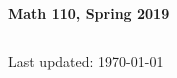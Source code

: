 \documentclass[12pt,letterpaper]{scrartcl}
\begin{document}
\thispagestyle{empty}
$ $
\vfill
\begin{center}
\centerline{\huge \textbf{Math 110, Spring 2019}} 
\end{center}
\vfill
$ $
\newpage
\tableofcontents
\newpage
\renewcommand\thesubsection{\thesection.\alph{subsection}}
\renewcommand\thesubsubsection{\thesection.\roman{subsubsection}}
 \vfill
 \vfill
 \vfill
 \vfill
 \vfill
 \vfill
 \vfill
 \vfill
% 
\begin{center} 
    Last updated: \today
\end{center} \vfill
\end{document}

